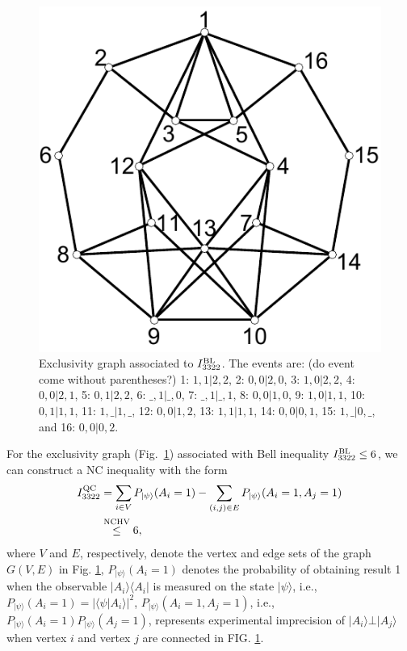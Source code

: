 \documentclass[pra,letterpaper,english,preprint,nofootinbib,aps,superscriptaddress,showkeys]{revtex4-1}
\theoremstyle{definition}
\theoremstyle{remark}
\newcommand{\add}[1]{\textcolor{zhliu}{#1}}
\newcommand\delete{\bgroup\markoverwith{\textcolor{zhliu}{\rule[0.5ex]{2pt}{0.8pt}}}\ULon}
\newcommand{\replace}[2]{\delete{#1}\add{#2}}
\newcommand{\add}[1]{#1}
\newcommand{\delete}[1]{\ignorespaces}
\newcommand{\replace}[2]{#2}
\begin{document}
\begin{figure}[h]
\centering
\includegraphics[scale=0.4]{i3322.pdf}
\caption{\label{Fig7}Exclusivity graph associated to $I_{3322}^{\rm BL}$.
The events are: \add{(do event come without parentheses?)}
 1: $1,1|2,2$,
 2: $0,0|2,0$,
 3: $1,0|2,2$,
 4: $0,0|2,1$,
 5: $0,1|2,2$,
 6: $\_,1|\_,0$,
 7: $\_,1|\_,1$,
 8: $0,0|1,0$,
 9: $1,0|1,1$,
10: $0,1|1,1$,
11: $1,\_|1,\_$,
12: $0,0|1,2$,
13: $1,1|1,1$,
14: $0,0|0,1$,
15: $1,\_|0,\_$, and
16: $0,0|0,2$.}
\end{figure}


For the exclusivity graph (Fig.~\ref{Fig7}) associated with Bell inequality $I_{3322}^{\rm BL}\leq 6$,
we can construct a NC inequality with the form\add{~\cite{cabello16}}
\begin{align}
I_{3322}^{\rm QC}
&=\sum_{i\in V}P_{|\psi\rangle}(A_i=1)-\sum_{(i,j)\in E}P_{|\psi\rangle}(A_i=1,A_j=1)\nonumber\\
&\overset{{\rm{NCHV}}}\leq 6,
\label{I3322QC}
\end{align}
where $V$ and $E$, respectively, denote the vertex and edge sets of the graph $G(V,E)$ in \replace{FIG}{Fig}. \ref{Fig7},
$P_{|\psi\rangle}(A_i=1)$ denotes the probability of obtaining result 1 when the observable $|A_i\rangle\langle A_i|$ is measured on the state $|\psi\rangle $,  i.e., $P_{|\psi\rangle}(A_i=1)= |\langle \psi|A_i\rangle|^2$, $P_{|\psi\rangle}(A_i=1,A_j=1)$, i.e.,  $P_{|\psi\rangle}(A_i=1)P_{|\psi\rangle}(A_j=1)$, represents experimental imprecision \replace{when}{of} $|A_i\rangle\bot |A_j\rangle$\replace{, i.e.,}{when} vertex $i$ and vertex $j$ are connected in FIG. \ref{Fig7}.
\end{document}
